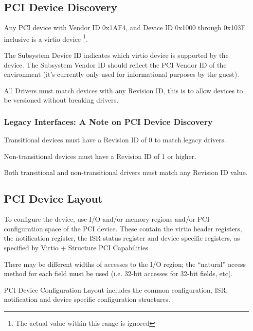 \subsection{PCI Device Discovery}\label{sec:Virtio Transport Options / Virtio Over PCI Bus / PCI Device Discovery}

Any PCI device with Vendor ID 0x1AF4, and Device ID 0x1000 through
0x103F inclusive is a virtio device
\footnote{The actual value within this range is ignored
}.

The Subsystem Device ID indicates which virtio device is
supported by the device. The Subsystem Vendor ID should reflect
the PCI Vendor ID of the environment (it's currently only used
for informational purposes by the guest).

All Drivers must match devices with any Revision ID, this
is to allow devices to be versioned without breaking drivers.

\subsubsection{Legacy Interfaces: A Note on PCI Device Discovery}\label{sec:Virtio Transport Options / Virtio Over PCI Bus / PCI Device Discovery / Legacy Interfaces: A Note on PCI Device Discovery}
Transitional devices must have a Revision ID of 0 to match
legacy drivers.

Non-transitional devices must have a Revision ID of 1 or higher.

Both transitional and non-transitional drivers must match
any Revision ID value.

\subsection{PCI Device Layout}\label{sec:Virtio Transport Options / Virtio Over PCI Bus / PCI Device Layout}

To configure the device,
use I/O and/or memory regions and/or PCI configuration space of the PCI device.
These contain the virtio header registers, the notification register, the
ISR status register and device specific registers, as specified by Virtio
+ Structure PCI Capabilities

There may be different widths of accesses to the I/O region; the
“natural” access method for each field must be
used (i.e. 32-bit accesses for 32-bit fields, etc).

PCI Device Configuration Layout includes the common configuration,
ISR, notification and device specific configuration
structures.

